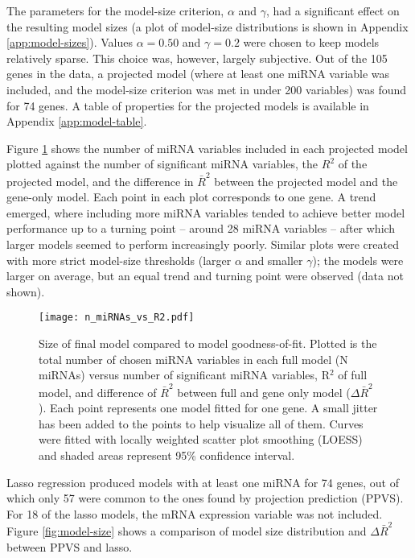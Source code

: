 The parameters for the model-size criterion, $\alpha$ and $\gamma$, had a
significant effect on the resulting model sizes (a plot of model-size
distributions is shown in Appendix \ref{app:model-sizes}).
Values $\alpha = 0.50$ and $\gamma = 0.2$ were chosen to keep models
relatively sparse. This choice was, however, largely subjective. Out of the
105 genes in the data, a projected model (where at least one miRNA variable
was included, and the model-size criterion was met in under 200 variables) was
found for 74 genes. A table of properties for the projected models is
available in Appendix \ref{app:model-table}.

Figure \ref{fig:n-miRNAs-vs-R2} shows the number of miRNA variables included in
each projected model plotted against the number of significant miRNA
variables, the $R^2$ of the projected model, and the difference in $\bar{R}^2$
between the projected model and the gene-only model. Each point in each plot
corresponds to one gene. A trend emerged, where including more
miRNA variables tended to achieve better model performance up to a turning point --
around 28 miRNA variables -- after which larger models seemed to perform
increasingly poorly. Similar plots were created with more strict model-size
thresholds (larger $\alpha$ and smaller $\gamma$); the models were larger on
average, but an equal trend and turning point were observed (data not shown).

\begin{figure}[!h]
  \centering
  \texttt{[image: n\_miRNAs\_vs\_R2.pdf]}
  \caption{Size of final model compared to model goodness-of-fit. Plotted is
  the total number of chosen miRNA variables in each full model (N miRNAs)
  versus number of significant miRNA variables, R$^2$ of full model, and
  difference of $\bar{R}^2$ between full and gene only model
  ($\Delta\bar{R}^2$). Each point represents one model fitted for one gene. A
  small jitter has been added to the points to help visualize all of them.
  Curves were fitted with locally weighted scatter plot smoothing (LOESS) and
  shaded areas represent 95\% confidence interval.}
  \label{fig:n-miRNAs-vs-R2}
\end{figure}

Lasso regression produced models with at least one miRNA for 74 genes, out of
which only 57 were common to the ones found by projection prediction (PPVS).
For 18 of the lasso models, the mRNA expression variable was not included.
Figure \ref{fig:model-size} shows a comparison of model size distribution
and $\Delta\bar{R}^2$ between PPVS and lasso.


